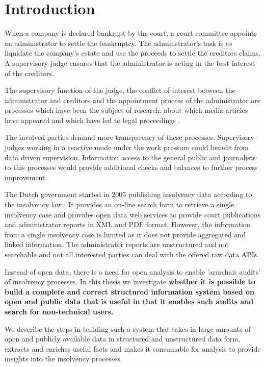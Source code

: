 \section{Introduction}
When a company is declared bankrupt by the court, a court committee appoints an administrator to settle the bankruptcy. The administrator's task is to liquidate the company's estate and use the proceeds to settle the creditors claims. A supervisory judge ensures that the administrator is acting in the best interest of the creditors. 

The supervisory function of the judge, the conflict of interest between the administrator and creditors and the appointment process of the administrator are processes which have been the subject of research\cite{boluk_2011}, about which media articles have appeared \cite{dennis_meneer_2018:1, dennis_meneer_2017:1, jan-hein_strop_2015:1} and which have led to legal proceedings . 

The involved parties demand more transparency of these processes. Supervisory judges working in a reactive mode under the work pressure could benefit from data driven supervision. Information access to the general public and journalists to this processes  would provide additional checks and balances to further process improvement.

The Dutch government started in 2005 publishing insolvency data\cite{rechtspraak:1} according to the insolvency law \cite{law:1}. It provides an on-line search form \cite{rechtspraak:4} to retrieve a single insolvency case and provides open data web services to provide court publications and administrator reports in XML and PDF format. However, the information from a single insolvency case is limited as it does not provide aggregated and linked information. The administrator reports are unstructured and not searchable and not all interested parties can deal with the offered raw data APIs. 

Instead of open data, there is a need for open analysis to enable 'armchair audits'\cite{o_leary_2015} of insolvency processes. In this thesis we investigate \textbf{whether it is possible to build a complete and correct structured information system based on open and public data that is useful in that it enables such audits and search for non-technical users.}

We describe the steps in building such a system that takes in large amounts of open and publicly available data in structured and unstructured data form, extracts and enriches useful facts and makes it consumable for analysis to provide insights into the insolvency processes.
